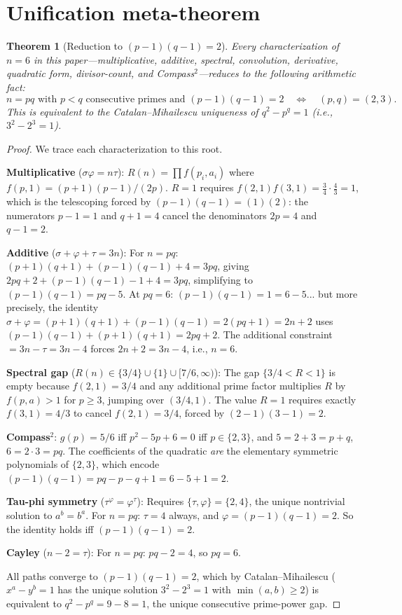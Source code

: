 \documentclass[11pt]{amsart}
\newtheorem{theorem}{Theorem}
\theoremstyle{remark}
\begin{document}
\section{Unification meta-theorem}

\begin{theorem}[Reduction to $(p-1)(q-1) = 2$]\label{thm:unification}
Every characterization of $n = 6$ in this paper---multiplicative,
additive, spectral, convolution, derivative, quadratic form,
divisor-count, and Compass${}^2$---reduces to the following
arithmetic fact:
\[
  n = pq \text{ with } p < q \text{ consecutive primes and }
  (p-1)(q-1) = 2
  \quad\Longleftrightarrow\quad
  (p, q) = (2, 3).
\]
This is equivalent to the Catalan--Mihailescu uniqueness of
$q^2 - p^q = 1$ (i.e., $3^2 - 2^3 = 1$).
\end{theorem}

\begin{proof}
We trace each characterization to this root.

\textbf{Multiplicative} ($\sigma\varphi = n\tau$):
$R(n) = \prod f(p_i, a_i)$ where $f(p,1) = (p+1)(p-1)/(2p)$.
$R = 1$ requires $f(2,1) f(3,1) = \frac{3}{4} \cdot \frac{4}{3} = 1$,
which is the telescoping forced by $(p-1)(q-1) = (1)(2)$:
the numerators $p-1 = 1$ and $q+1 = 4$ cancel the denominators $2p = 4$
and $q-1 = 2$.

\textbf{Additive} ($\sigma + \varphi + \tau = 3n$):
For $n = pq$: $(p+1)(q+1) + (p-1)(q-1) + 4 = 3pq$,
giving $2pq + 2 + (p-1)(q-1) - 1 + 4 = 3pq$,
simplifying to $(p-1)(q-1) = pq - 5$.
At $pq = 6$: $(p-1)(q-1) = 1 = 6 - 5$... but more precisely,
the identity $\sigma + \varphi = (p+1)(q+1) + (p-1)(q-1) = 2(pq + 1) = 2n + 2$
uses $(p-1)(q-1) + (p+1)(q+1) = 2pq + 2$.
The additional constraint $= 3n - \tau = 3n - 4$ forces $2n + 2 = 3n - 4$,
i.e., $n = 6$.

\textbf{Spectral gap} ($R(n) \in \{3/4\} \cup \{1\} \cup [7/6, \infty)$):
The gap $\{3/4 < R < 1\}$ is empty because
$f(2,1) = 3/4$ and any additional prime factor multiplies $R$
by $f(p, a) > 1$ for $p \geq 3$, jumping over $(3/4, 1)$.
The value $R = 1$ requires exactly $f(3,1) = 4/3$ to cancel $f(2,1) = 3/4$,
forced by $(2-1)(3-1) = 2$.

\textbf{Compass${}^2$}:
$g(p) = 5/6$ iff $p^2 - 5p + 6 = 0$ iff $p \in \{2,3\}$,
and $5 = 2 + 3 = p + q$, $6 = 2 \cdot 3 = pq$.
The coefficients of the quadratic \emph{are} the elementary
symmetric polynomials of $\{2, 3\}$, which encode $(p-1)(q-1) = pq - p - q + 1 = 6 - 5 + 1 = 2$.

\textbf{Tau-phi symmetry} ($\tau^{\varphi} = \varphi^{\tau}$):
Requires $\{\tau, \varphi\} = \{2, 4\}$, the unique nontrivial solution to $a^b = b^a$.
For $n = pq$: $\tau = 4$ always, and $\varphi = (p-1)(q-1) = 2$.
So the identity holds iff $(p-1)(q-1) = 2$.

\textbf{Cayley} ($n - 2 = \tau$):
For $n = pq$: $pq - 2 = 4$, so $pq = 6$.

All paths converge to $(p-1)(q-1) = 2$, which by
Catalan--Mihailescu ($x^a - y^b = 1$ has the unique solution
$3^2 - 2^3 = 1$ with $\min(a,b) \geq 2$) is equivalent to
$q^2 - p^q = 9 - 8 = 1$, the unique consecutive prime-power gap.
\end{proof}
\end{document}
